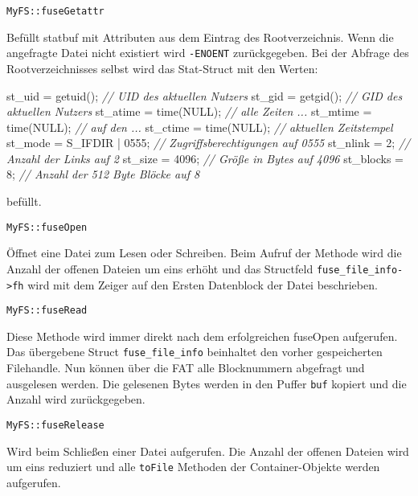 \documentclass[]{article}
\newenvironment{Shaded}{}{}
\newcommand{\CommentTok}[1]{\textcolor[rgb]{0.38,0.63,0.69}{\textit{#1}}}
\newcommand{\DecValTok}[1]{\textcolor[rgb]{0.25,0.63,0.44}{#1}}
\newcommand{\NormalTok}[1]{#1}
\begin{document}
\texttt{MyFS::fuseGetattr}

Befüllt statbuf mit Attributen aus dem Eintrag des Rootverzeichnis. Wenn
die angefragte Datei nicht existiert wird \texttt{-ENOENT}
zurückgegeben. Bei der Abfrage des Rootverzeichnisses selbst wird das
Stat-Struct mit den Werten:

\begin{Shaded}
  \begin{framed}
\begin{Highlighting}[]
\NormalTok{st_uid = getuid();        }\CommentTok{// UID des aktuellen Nutzers}
\NormalTok{st_gid = getgid();        }\CommentTok{// GID des aktuellen Nutzers}
\NormalTok{st_atime = time(NULL);    }\CommentTok{// alle Zeiten ...}
\NormalTok{st_mtime = time(NULL);    }\CommentTok{// auf den ...}
\NormalTok{st_ctime = time(NULL);    }\CommentTok{// aktuellen Zeitstempel}
\NormalTok{st_mode = S_IFDIR | }\DecValTok{0555}\NormalTok{; }\CommentTok{// Zugriffsberechtigungen auf 0555}
\NormalTok{st_nlink = }\DecValTok{2}\NormalTok{;             }\CommentTok{// Anzahl der Links auf 2}
\NormalTok{st_size = }\DecValTok{4096}\NormalTok{;           }\CommentTok{// Größe in Bytes auf 4096}
\NormalTok{st_blocks = }\DecValTok{8}\NormalTok{;            }\CommentTok{// Anzahl der 512 Byte Blöcke auf 8}
\end{Highlighting}
\end{framed}
\end{Shaded}

befüllt.

\texttt{MyFS::fuseOpen}

Öffnet eine Datei zum Lesen oder Schreiben. Beim Aufruf der Methode wird
die Anzahl der offenen Dateien um eins erhöht und das Structfeld
\texttt{fuse\_file\_info-\textgreater{}fh} wird mit dem Zeiger auf den
Ersten Datenblock der Datei beschrieben.

\texttt{MyFS::fuseRead}

Diese Methode wird immer direkt nach dem erfolgreichen fuseOpen
aufgerufen. Das übergebene Struct \texttt{fuse\_file\_info} beinhaltet
den vorher gespeicherten Filehandle. Nun können über die FAT alle
Blocknummern abgefragt und ausgelesen werden. Die gelesenen Bytes werden in den
Puffer \texttt{buf} kopiert und die Anzahl wird zurückgegeben.

\texttt{MyFS::fuseRelease}

Wird beim Schließen einer Datei aufgerufen. Die Anzahl der offenen
Dateien wird um eins reduziert und alle \texttt{toFile} Methoden der
Container-Objekte werden aufgerufen.
\end{document}
